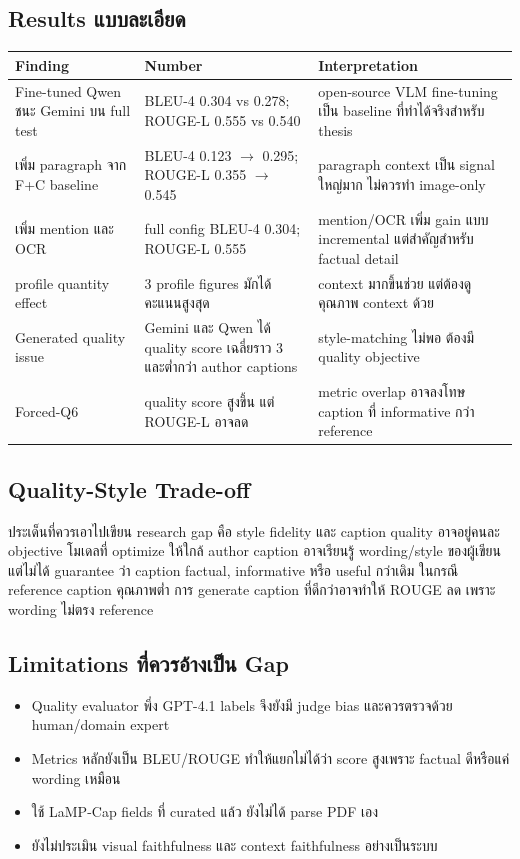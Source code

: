 \documentclass[10pt,a4paper]{article}
\begin{document}
\subsection{Results แบบละเอียด}
\begin{longtable}{@{}L{4.2cm}L{4.2cm}L{6.2cm}@{}}
\toprule
\textbf{Finding} & \textbf{Number} & \textbf{Interpretation} \\
\midrule
Fine-tuned Qwen ชนะ Gemini บน full test & BLEU-4 0.304 vs 0.278; ROUGE-L 0.555 vs 0.540 & open-source VLM fine-tuning เป็น baseline ที่ทำได้จริงสำหรับ thesis \\
เพิ่ม paragraph จาก F+C baseline & BLEU-4 0.123 \(\rightarrow\) 0.295; ROUGE-L 0.355 \(\rightarrow\) 0.545 & paragraph context เป็น signal ใหญ่มาก ไม่ควรทำ image-only \\
เพิ่ม mention และ OCR & full config BLEU-4 0.304; ROUGE-L 0.555 & mention/OCR เพิ่ม gain แบบ incremental แต่สำคัญสำหรับ factual detail \\
profile quantity effect & 3 profile figures มักได้คะแนนสูงสุด & context มากขึ้นช่วย แต่ต้องดูคุณภาพ context ด้วย \\
Generated quality issue & Gemini และ Qwen ได้ quality score เฉลี่ยราว 3 และต่ำกว่า author captions & style-matching ไม่พอ ต้องมี quality objective \\
Forced-Q6 & quality score สูงขึ้น แต่ ROUGE-L อาจลด & metric overlap อาจลงโทษ caption ที่ informative กว่า reference \\
\bottomrule
\end{longtable}

\subsection{Quality-Style Trade-off}
ประเด็นที่ควรเอาไปเขียน research gap คือ style fidelity และ caption quality อาจอยู่คนละ objective โมเดลที่ optimize ให้ใกล้ author caption อาจเรียนรู้ wording/style ของผู้เขียน แต่ไม่ได้ guarantee ว่า caption factual, informative หรือ useful กว่าเดิม ในกรณี reference caption คุณภาพต่ำ การ generate caption ที่ดีกว่าอาจทำให้ ROUGE ลด เพราะ wording ไม่ตรง reference

\subsection{Limitations ที่ควรอ้างเป็น Gap}
\begin{itemize}
\item Quality evaluator พึ่ง GPT-4.1 labels จึงยังมี judge bias และควรตรวจด้วย human/domain expert
\item Metrics หลักยังเป็น BLEU/ROUGE ทำให้แยกไม่ได้ว่า score สูงเพราะ factual ดีหรือแค่ wording เหมือน
\item ใช้ LaMP-Cap fields ที่ curated แล้ว ยังไม่ได้ parse PDF เอง
\item ยังไม่ประเมิน visual faithfulness และ context faithfulness อย่างเป็นระบบ
\end{itemize}
\end{document}
